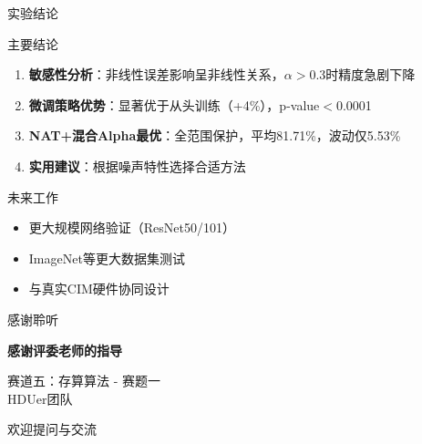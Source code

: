 \documentclass[aspectratio=169]{beamer}
\begin{document}
\begin{frame}{实验结论}
\begin{block}{主要结论}
\begin{enumerate}
\item \textbf{敏感性分析}：非线性误差影响呈非线性关系，$\alpha>0.3$时精度急剧下降
\item \textbf{微调策略优势}：显著优于从头训练（+4\%），p-value$<$0.0001
\item \textbf{NAT+混合Alpha最优}：全范围保护，平均81.71\%，波动仅5.53\%
\item \textbf{实用建议}：根据噪声特性选择合适方法
\end{enumerate}
\end{block}
\vfill
\begin{block}{未来工作}
\begin{itemize}
\item 更大规模网络验证（ResNet50/101）
\item ImageNet等更大数据集测试
\item 与真实CIM硬件协同设计
\end{itemize}
\end{block}
\end{frame}

\begin{frame}{感谢聆听}
\vfill
\begin{center}
\Large\textbf{感谢评委老师的指导}
\end{center}
\vfill
\begin{center}
赛道五：存算算法 - 赛题一 \\
HDUer团队
\end{center}
\vfill
\begin{center}
\Large{欢迎提问与交流}
\end{center}
\end{frame}
\end{document}
